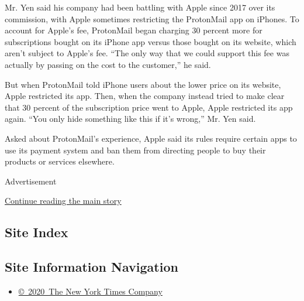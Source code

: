 Mr. Yen said his company had been battling with Apple since 2017 over
its commission, with Apple sometimes restricting the ProtonMail app on
iPhones. To account for Apple's fee, ProtonMail began charging 30
percent more for subscriptions bought on its iPhone app versus those
bought on its website, which aren't subject to Apple's fee. ``The only
way that we could support this fee was actually by passing on the cost
to the customer,'' he said.

But when ProtonMail told iPhone users about the lower price on its
website, Apple restricted its app. Then, when the company instead tried
to make clear that 30 percent of the subscription price went to Apple,
Apple restricted its app again. ``You only hide something like this if
it's wrong,'' Mr. Yen said.

Asked about ProtonMail's experience, Apple said its rules require
certain apps to use its payment system and ban them from directing
people to buy their products or services elsewhere.

Advertisement

\protect\hyperlink{after-bottom}{Continue reading the main story}

\hypertarget{site-index}{%
\subsection{Site Index}\label{site-index}}

\hypertarget{site-information-navigation}{%
\subsection{Site Information
Navigation}\label{site-information-navigation}}

\begin{itemize}
\tightlist
\item
  \href{https://help.nytimes.com/hc/en-us/articles/115014792127-Copyright-notice}{©~2020~The
  New York Times Company}
\end{itemize}

